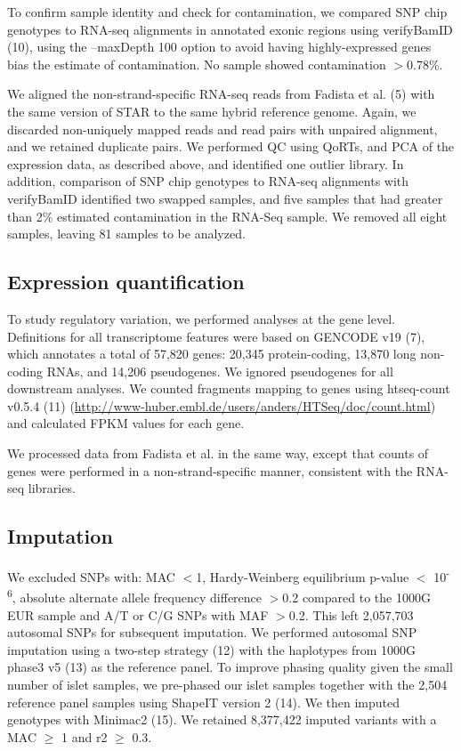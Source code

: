 To confirm sample identity and check for contamination, we compared SNP chip genotypes to RNA-seq alignments in annotated exonic regions using verifyBamID (10), using the --maxDepth 100 option to avoid having highly-expressed genes bias the estimate of contamination. No sample showed contamination $>$0.78\%.

We aligned the non-strand-specific RNA-seq reads from Fadista et al. (5) with the same version of STAR to the same hybrid reference genome. Again, we discarded non-uniquely mapped reads and read pairs with unpaired alignment, and we retained duplicate pairs. We performed QC using QoRTs, and PCA of the expression data, as described above, and identified one outlier library.  In addition, comparison of SNP chip genotypes to RNA-seq alignments with verifyBamID identified two swapped samples, and five samples that had greater than 2\% estimated contamination in the RNA-Seq sample. We removed all eight samples, leaving 81 samples to be analyzed.

\subsection{Expression quantification}
To study regulatory variation, we performed analyses at the gene level. Definitions for all transcriptome features were based on GENCODE v19 (7), which annotates a total of 57,820 genes: 20,345 protein-coding, 13,870 long non-coding RNAs, and 14,206 pseudogenes. We ignored pseudogenes for all downstream analyses. We counted fragments mapping to genes using htseq-count v0.5.4 (11) (\url{http://www-huber.embl.de/users/anders/HTSeq/doc/count.html}) and calculated FPKM values for each gene. 

We processed data from Fadista et al. in the same way, except that counts of genes were performed in a non-strand-specific manner, consistent with the RNA-seq libraries.

\subsection{Imputation} 
We excluded SNPs with: MAC $<$1, Hardy-Weinberg equilibrium p-value $<$ 10\textsuperscript{-6}, absolute alternate allele frequency difference $>$0.2 compared to the 1000G EUR sample and A/T or C/G SNPs with MAF $>$0.2.  This left 2,057,703 autosomal SNPs for subsequent imputation. We performed autosomal SNP imputation using a two-step strategy (12) with the haplotypes from 1000G phase3 v5 (13) as the reference panel. To improve phasing quality given the small number of islet samples, we pre-phased our islet samples together with the 2,504 reference panel samples using ShapeIT version 2 (14). We then imputed genotypes with Minimac2  (15). We retained 8,377,422 imputed variants with a MAC $\geq$ 1 and r2 $\geq$ 0.3.


